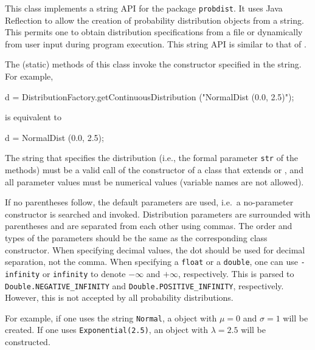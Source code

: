 
This class implements a string API for the package \texttt{probdist}.
It uses Java Reflection to allow the creation of probability distribution
objects from a string.  This permits one to obtain distribution specifications 
from a file or dynamically from user input during program execution.
This string API is similar to that of 
\cite{iLEY02a}.

The (static) methods of this class invoke the constructor specified 
in the string.  For example,
\begin{vcode}
 d = DistributionFactory.getContinuousDistribution ("NormalDist (0.0, 2.5)");
\end{vcode}
is equivalent to
\begin{vcode}
 d = NormalDist (0.0, 2.5);
\end{vcode}

The string that specifies the distribution (i.e., the formal parameter
\texttt{str} of the methods) must be a valid call of the constructor
of a class that extends  or
, and all parameter values must be numerical
values (variable names are not allowed).
%
\begin{hide} %
If no parentheses follow, the default parameters are used, i.e.\ a
no-parameter constructor is searched and invoked.  Distribution parameters
are surrounded with parentheses and are separated from each other using
commas.  The order and types of the parameters should be the same
as the corresponding class constructor. When specifying decimal values, the dot
should be used for decimal separation, not the comma.  When specifying a 
 \texttt{float} or a \texttt{double}, one can use \texttt{-infinity} or 
 \texttt{infinity} to denote $-\infty$ and $+\infty$,
respectively.  This is parsed to \texttt{Double.NEGATIVE\_INFINITY}
and \texttt{Double.POSITIVE\_INFINITY}, respectively.  However, this
is not accepted by all probability distributions.

For example, if one uses the string \texttt{Normal},
a  object with $\mu = 0$ and $\sigma = 1$ will be created.
If one uses \texttt{Exponential(2.5)}, an 
object with $\lambda=2.5$ will be constructed.
\end{hide}  %

